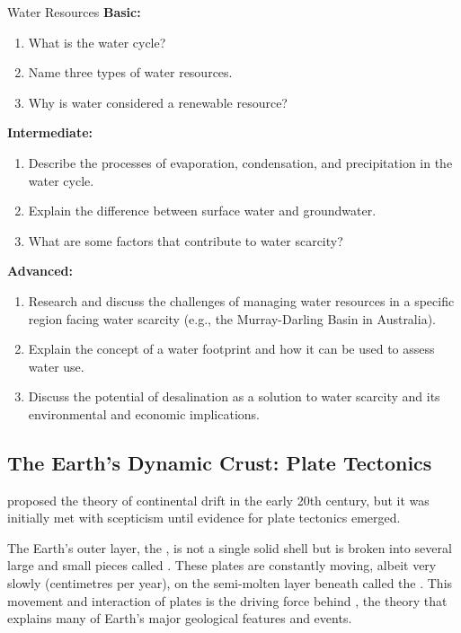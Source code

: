 \begin{tieredquestions}{Water Resources}
\textbf{Basic:}
\begin{enumerate}
    \item What is the water cycle?
    \item Name three types of water resources.
    \item Why is water considered a renewable resource?
\end{enumerate}
\textbf{Intermediate:}
\begin{enumerate}
    \item Describe the processes of evaporation, condensation, and precipitation in the water cycle.
    \item Explain the difference between surface water and groundwater.
    \item What are some factors that contribute to water scarcity?
\end{enumerate}
\textbf{Advanced:}
\begin{enumerate}
    \item Research and discuss the challenges of managing water resources in a specific region facing water scarcity (e.g., the Murray-Darling Basin in Australia).
    \item  Explain the concept of a water footprint and how it can be used to assess water use.
    \item  Discuss the potential of desalination as a solution to water scarcity and its environmental and economic implications.
\end{enumerate}
\end{tieredquestions}


\FloatBarrier
\1

\subsection{The Earth's Dynamic Crust: Plate Tectonics}

\begin{marginnote}
 proposed the theory of continental drift in the early 20th century, but it was initially met with scepticism until evidence for plate tectonics emerged.
\end{marginnote}

The Earth's outer layer, the , is not a single solid shell but is broken into several large and small pieces called . These plates are constantly moving, albeit very slowly (centimetres per year), on the semi-molten layer beneath called the . This movement and interaction of plates is the driving force behind , the theory that explains many of Earth's major geological features and events.

